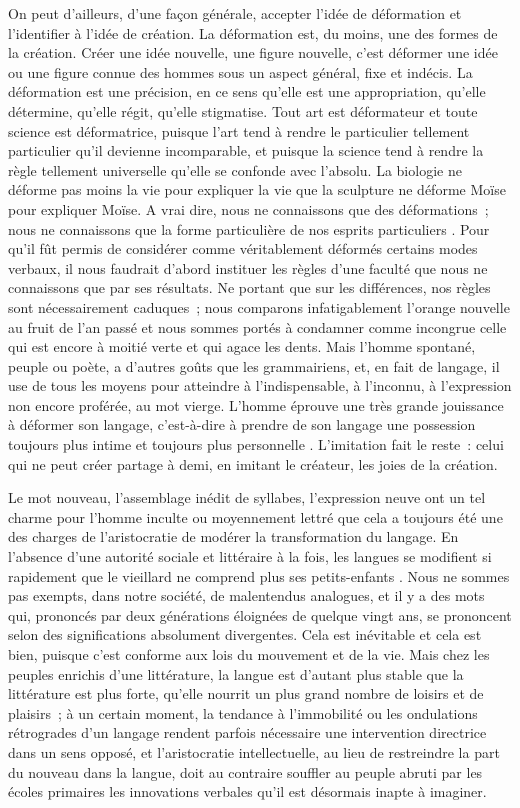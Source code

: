\documentclass[french,twoside]{book} %
\begin{document}
On peut d’ailleurs, d’une façon générale, accepter l’idée de déformation et l’identifier à l’idée de création. La déformation est, du moins, une des formes de la création. Créer une idée nouvelle, une figure nouvelle, c’est déformer une idée ou une figure connue des hommes sous un aspect général, fixe et indécis. La déformation est une précision, en ce sens qu’elle est une appropriation, qu’elle détermine, qu’elle régit, qu’elle stigmatise. Tout art est déformateur et toute science est déformatrice, puisque l’art tend à rendre le particulier tellement particulier qu’il devienne incomparable, et puisque la science tend à rendre la règle tellement universelle qu’elle se confonde avec l’absolu. La biologie ne déforme pas moins la vie pour expliquer la vie que la sculpture ne déforme Moïse pour expliquer Moïse. A vrai dire, nous ne connaissons que des déformations ; nous ne connaissons que la forme particulière de nos esprits particuliers . Pour qu’il fût permis de considérer comme véritablement déformés certains modes verbaux, il nous faudrait d’abord instituer les règles d’une faculté que nous ne connaissons que par ses résultats. Ne portant que sur les différences, nos règles sont nécessairement caduques ; nous comparons infatigablement l’orange nouvelle au fruit de l’an passé et nous sommes portés à condamner comme incongrue celle qui est encore à moitié verte et qui agace les dents. Mais l’homme spontané, peuple ou poète, a d’autres goûts que les grammairiens, et, en fait de langage, il use de tous les moyens pour atteindre à l’indispensable, à l’inconnu, à l’expression non encore proférée, au mot vierge. L’homme éprouve une très grande jouissance à déformer son langage, c’est-à-dire à prendre de son langage une possession toujours plus intime et toujours plus personnelle . L’imitation fait le reste : celui qui ne peut créer partage à demi, en imitant le créateur, les joies de la création.\par
Le mot nouveau, l’assemblage inédit de syllabes, l’expression neuve ont un tel charme pour l’homme inculte ou moyennement lettré que cela a toujours été une des charges de l’aristocratie de modérer la transformation du langage. En l’absence d’une autorité sociale et littéraire à la fois, les langues se modifient si rapidement que le vieillard ne comprend plus ses petits-enfants . Nous ne sommes pas exempts, dans notre société, de malentendus analogues, et il y a des mots qui, prononcés par deux générations éloignées de quelque vingt ans, se prononcent selon des significations absolument divergentes. Cela est inévitable et cela est bien, puisque c’est conforme aux lois du mouvement et de la vie. Mais chez les peuples enrichis d’une littérature, la langue est d’autant plus stable que la littérature est plus forte, qu’elle nourrit un plus grand nombre de loisirs et de plaisirs ; à un certain moment, la tendance à l’immobilité ou les ondulations rétrogrades d’un langage rendent parfois nécessaire une intervention directrice dans un sens opposé, et l’aristocratie intellectuelle, au lieu de restreindre la part du nouveau dans la langue, doit au contraire souffler au peuple abruti par les écoles primaires les innovations verbales qu’il est désormais inapte à imaginer.\par
\end{document}
